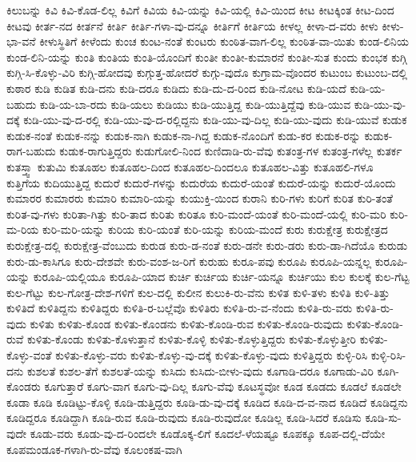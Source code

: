 {ಕಿಲುಬನ್ನು
ಕಿವಿ
ಕಿವಿ-ಕೊಡ-ಲಿಲ್ಲ
ಕಿವಿಗೆ
ಕಿವಿಯ
ಕಿವಿ-ಯನ್ನು
ಕಿವಿ-ಯಲ್ಲಿ
ಕಿವಿ-ಯಿಂದ
ಕೀಟ
ಕೀಟಕ್ಕಿಂತ
ಕೀಟ-ದಿಂದ
ಕೀಟವು
ಕೀರ್ತ-ನದ
ಕೀರ್ತನೆ
ಕೀರ್ತಿ
ಕೀರ್ತಿ-ಗಳಾ-ವು-ದನ್ನೂ
ಕೀರ್ತಿಗೆ
ಕೀರ್ತಿಯ
ಕೀಳಲ್ಲ
ಕೀಳಾ-ದ-ವರು
ಕೀಳು
ಕೀಳು-ಭಾ-ವನೆ
ಕೀಳುಸ್ಥಿತಿಗೆ
ಕೀಳೆಂದು
ಕುಂಚ
ಕುಂಟ-ನಂತೆ
ಕುಂಟರು
ಕುಂಠಿತ-ವಾಗ-ಲಿಲ್ಲ
ಕುಂಠಿತ-ವಾ-ಯಿತು
ಕುಂಡ-ಲಿನಿಯ
ಕುಂಡ-ಲಿನಿ-ಯನ್ನು
ಕುಂತಿ
ಕುಂತಿಯ
ಕುಂತಿ-ಯೊಂದಿಗೆ
ಕುಂತೀ
ಕುಂತೀ-ಕುಮಾರನೆ
ಕುಂತೀ-ಸುತ
ಕುಂದು
ಕುಂಭಕ
ಕುಗ್ಗಿ
ಕುಗ್ಗಿ-ಸಿ-ಕೊಳ್ಳು-ವಿರಿ
ಕುಗ್ಗಿ-ಹೋದವು
ಕುಗ್ಗುತ್ತ-ಹೋದರೆ
ಕುಗ್ಗು-ವುದೊ
ಕುಗ್ರಾಮ-ವೊಂದರ
ಕುಟುಂಬ
ಕುಟುಂಬ-ದಲ್ಲಿ
ಕುಠಾರ
ಕುಡಿ
ಕುಡಿತ
ಕುಡಿ-ದನು
ಕುಡಿ-ದರೂ
ಕುಡಿದು
ಕುಡಿ-ದು-ದ-ರಿಂದ
ಕುಡಿ-ನೋಟ
ಕುಡಿ-ಯದೆ
ಕುಡಿ-ಯ-ಬಹುದು
ಕುಡಿ-ಯ-ಬಾ-ರದು
ಕುಡಿ-ಯಲು
ಕುಡಿಯು
ಕುಡಿ-ಯುತ್ತಿದ್ದ
ಕುಡಿ-ಯುತ್ತಿದ್ದೆವು
ಕುಡಿ-ಯುವ
ಕುಡಿ-ಯು-ವು-ದಕ್ಕೆ
ಕುಡಿ-ಯು-ವು-ದ-ರಲ್ಲಿ
ಕುಡಿ-ಯು-ವು-ದ-ರಲ್ಲಿದ್ದನು
ಕುಡಿ-ಯು-ವು-ದಿಲ್ಲ
ಕುಡಿ-ಯು-ವುದು
ಕುಡಿ-ಯುವೆ
ಕುಡುಕ
ಕುಡುಕ-ನಂತೆ
ಕುಡುಕ-ನನ್ನು
ಕುಡುಕ-ನಾಗಿ
ಕುಡುಕ-ನಾ-ಗಿದ್ದ
ಕುಡುಕ-ನೊಂದಿಗೆ
ಕುಡು-ಕರ
ಕುಡುಕ-ರನ್ನು
ಕುಡುಕ-ರಾಗ-ಬಹುದು
ಕುಡುಕ-ರಾಗುತ್ತಿದ್ದರು
ಕುಡುಗೋಲಿ-ನಿಂದ
ಕುಣಿದಾಡಿ-ರು-ವೆವು
ಕುತಂತ್ರ-ಗಳ
ಕುತಂತ್ರ-ಗಳೆಲ್ಲ
ಕುತರ್ಕ
ಕುತಸ್ತ್ವಾ
ಕುತುಮಿ
ಕುತೂಹಲ
ಕುತೂಹಲ-ದಿಂದ
ಕುತೂಹಲ-ದಿಂದಲೂ
ಕುತೂಹಲ-ವಿತ್ತು
ಕುತೂಹಲಿ-ಗಳೂ
ಕುತ್ತಿಗೆಯ
ಕುದಿಯುತ್ತಿದ್ದ
ಕುದುರೆ
ಕುದುರೆ-ಗಳನ್ನು
ಕುದುರೆಯ
ಕುದುರೆ-ಯಂತೆ
ಕುದುರೆ-ಯನ್ನು
ಕುದುರೆ-ಯೊಂದು
ಕುಮಾರರ
ಕುಮಾರರು
ಕುಮಾರಿ
ಕುಮಾರಿ-ಯನ್ನು
ಕುಯುಕ್ತಿ-ಯಿಂದ
ಕುರಾನಿ
ಕುರಿ-ಗಳು
ಕುರಿಗೆ
ಕುರಿತ
ಕುರಿ-ತಂತೆ
ಕುರಿತ-ವು-ಗಳು
ಕುರಿತಾ-ಗಿತ್ತು
ಕುರಿ-ತಾದ
ಕುರಿತು
ಕುರಿತೂ
ಕುರಿ-ಮಂದೆ-ಯಂತೆ
ಕುರಿ-ಮಂದೆ-ಯಲ್ಲಿ
ಕುರಿ-ಮರಿ
ಕುರಿ-ಮ-ರಿಯ
ಕುರಿ-ಮರಿ-ಯನ್ನು
ಕುರಿಯ
ಕುರಿ-ಯಂತೆ
ಕುರಿ-ಯನ್ನು
ಕುರಿಯ-ಮಂದೆ
ಕುರು
ಕುರುಕ್ಷೇತ್ರ
ಕುರುಕ್ಷೇತ್ರದ
ಕುರುಕ್ಷೇತ್ರ-ದಲ್ಲಿ
ಕುರುಕ್ಷೇತ್ರ-ವೆಂಬುದು
ಕುರುಡ
ಕುರು-ಡ-ನಂತೆ
ಕುರು-ಡನೇ
ಕುರು-ಡರು
ಕುರು-ಡಾ-ಗಿದೆಯೊ
ಕುರುಡು
ಕುರು-ಡು-ಕಾಸಿಗೂ
ಕುರು-ದೇಶವೇ
ಕುರು-ವಂಶ-ಜ-ರಿಗೆ
ಕುರುಹು
ಕುರೂ-ಪವು
ಕುರೂಪಿ
ಕುರೂಪಿ-ಯನ್ನಲ್ಲ
ಕುರೂಪಿ-ಯನ್ನು
ಕುರೂಪಿ-ಯಲ್ಲಿಯೂ
ಕುರೂಪಿ-ಯಾದ
ಕುರ್ಚಿ
ಕುರ್ಚಿಯ
ಕುರ್ಚಿ-ಯನ್ನೂ
ಕುರ್ಚಿಯು
ಕುಲ
ಕುಲಕ್ಕೆ
ಕುಲ-ಗೆಟ್ಟ
ಕುಲ-ಗೆಟ್ಟು
ಕುಲ-ಗೋತ್ರ-ದೇಶ-ಗಳಿಗೆ
ಕುಲ-ದಲ್ಲಿ
ಕುಲೀನ
ಕುಲುಕಿ-ರು-ವೆನು
ಕುಳಿತ
ಕುಳಿ-ತಳು
ಕುಳಿತಿ
ಕುಳಿ-ತಿತ್ತು
ಕುಳಿತಿದೆ
ಕುಳಿತಿದ್ದನು
ಕುಳಿತಿದ್ದರು
ಕುಳಿತಿ-ರ-ಬಲ್ಲೆವೊ
ಕುಳಿತಿರು
ಕುಳಿತಿ-ರು-ವ-ನೆಂದು
ಕುಳಿತಿ-ರು-ವರು
ಕುಳಿತಿ-ರು-ವುದು
ಕುಳಿತು
ಕುಳಿತು-ಕೊಂಡ
ಕುಳಿತು-ಕೊಂಡನು
ಕುಳಿತು-ಕೊಂಡಿ-ರುವ
ಕುಳಿತು-ಕೊಂಡಿ-ರುವುದು
ಕುಳಿತು-ಕೊಂಡಿ-ರುವೆ
ಕುಳಿತು-ಕೊಂಡು
ಕುಳಿತು-ಕೊಳುತ್ತಾನೆ
ಕುಳಿತು-ಕೊಳ್ಳಿ
ಕುಳಿತು-ಕೊಳ್ಳುತ್ತಿದ್ದರು
ಕುಳಿತು-ಕೊಳ್ಳುತ್ತೀರಿ
ಕುಳಿತು-ಕೊಳ್ಳು-ವಂತೆ
ಕುಳಿತು-ಕೊಳ್ಳು-ವರು
ಕುಳಿತು-ಕೊಳ್ಳು-ವು-ದಕ್ಕೆ
ಕುಳಿತು-ಕೊಳ್ಳು-ವುದು
ಕುಳಿತ್ತಿದ್ದರು
ಕುಳ್ಳಿ-ರಿಸಿ
ಕುಳ್ಳಿ-ರಿಸಿ-ದನು
ಕುಶಲತೆ
ಕುಶಲ-ತೆಗೆ
ಕುಶಲತೆ-ಯನ್ನು
ಕುಸಿದು
ಕುಸಿದು-ಬೀಳು-ವುದು
ಕೂಗಾಡಿ-ದರೂ
ಕೂಗಾಡು-ವಿರಿ
ಕೂಗಿ-ಕೊಂಡರು
ಕೂಗುತ್ತಾರೆ
ಕೂಗು-ವಾಗ
ಕೂಗು-ವು-ದಿಲ್ಲ
ಕೂಗು-ವೆವು
ಕೂಟಸ್ಥವೋ
ಕೂಡ
ಕೂಡದು
ಕೂಡಲೆ
ಕೂಡಲೇ
ಕೂಡಾ
ಕೂಡಿ
ಕೂಡಿಟ್ಟು-ಕೊಳ್ಳಿ
ಕೂಡಿ-ಡುತ್ತಿದ್ದರು
ಕೂಡಿ-ಡು-ವು-ದಕ್ಕೆ
ಕೂಡಿದ
ಕೂಡಿ-ದ-ವ-ನಾದ
ಕೂಡಿದೆ
ಕೂಡಿದ್ದನು
ಕೂಡಿದ್ದರೂ
ಕೂಡಿದ್ದಾಗಿ
ಕೂಡಿ-ರುವ
ಕೂಡಿ-ರುವುದು
ಕೂಡಿ-ರುವುದೋ
ಕೂಡಿಲ್ಲ
ಕೂಡಿ-ಸಿದರೆ
ಕೂಡಿಸು
ಕೂಡಿ-ಸು-ವುದೇ
ಕೂಡು-ವರು
ಕೂಡು-ವು-ದ-ರಿಂದಲೇ
ಕೂಡೊಕ್ಕ-ಲಿಗೆ
ಕೂದಲೆ-ಳೆಯಷ್ಟೂ
ಕೂಪಕ್ಕೂ
ಕೂಪ-ದಲ್ಲಿ-ದೆಯೇ
ಕೂಪಮಂಡೂಕ-ಗಳಾಗಿ-ರು-ವೆವು
ಕೂಲಂಕಷ-ವಾಗಿ
}
